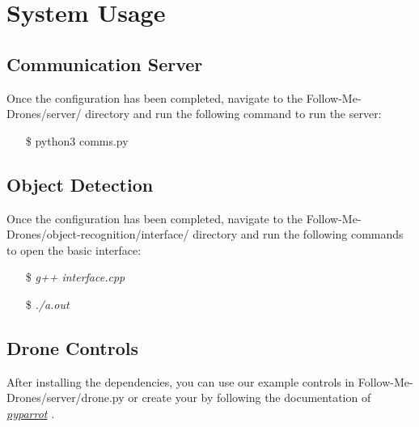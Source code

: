 \chapter{System Usage}

\section{Communication Server}

Once the configuration has been completed, navigate to the Follow-Me-Drones/server/ directory and run the following command to run the server:
\begin{itemize}
    \item[\$] python3 comms.py
\end{itemize}

\section{Object Detection}

Once the configuration has been completed, navigate to the Follow-Me-Drones/object-recognition/interface/ directory and run the following commands to open the basic interface:
\begin{itemize}
    \item[\$] \textit{g++ interface.cpp}
    \item[\$] \textit{./a.out}
\end{itemize}

\section{Drone Controls}
After installing the dependencies, you can use our example controls in Follow-Me-Drones/server/drone.py or create your by following the documentation of \href{https://pyparrot.readthedocs.io/en/latest/}{\textit{pyparrot}} \cite{pyparrot}.
